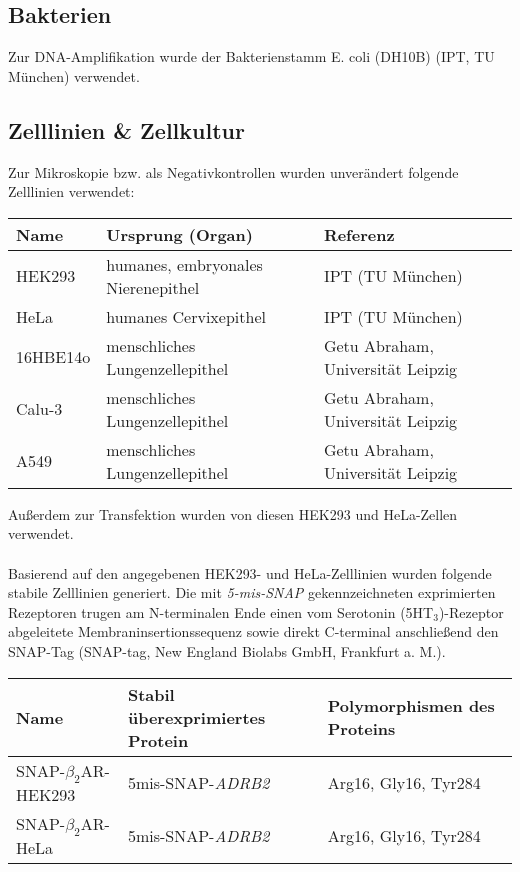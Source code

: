 \subsection{Bakterien}
Zur DNA-Amplifikation wurde der Bakterienstamm E. coli (DH10B) (IPT, TU München) verwendet.

\subsection{Zelllinien \& Zellkultur}
Zur Mikroskopie bzw. als Negativkontrollen wurden unverändert folgende Zelllinien verwendet:

\begin{table}[htsp]
	\begin{tabularx}{\textwidth}{lll}
\toprule
Name		&	Ursprung (Organ)				&	Referenz\\
\midrule
HEK293		&	humanes, embryonales Nierenepithel		&	IPT (TU München)\\
HeLa		&	humanes Cervixepithel					&	IPT (TU München)\\
\midrule
16HBE14o		&	menschliches Lungenzellepithel			&	Getu Abraham, Universität Leipzig\\
Calu-3			&	menschliches Lungenzellepithel			&	Getu Abraham, Universität Leipzig\\
A549			&	menschliches Lungenzellepithel			&	Getu Abraham, Universität Leipzig\\
\bottomrule
\end{tabularx}
\end{table}

Außerdem zur Transfektion wurden von diesen HEK293 und HeLa-Zellen verwendet.
\\ \\
Basierend auf den angegebenen HEK293- und HeLa-Zelllinien wurden folgende stabile Zelllinien generiert. Die mit \textit{5-mis-SNAP} gekennzeichneten exprimierten Rezeptoren trugen am N-terminalen Ende einen vom Serotonin (5HT$_3$)-Rezeptor abgeleitete Membraninsertionssequenz sowie direkt C-terminal anschließend den SNAP-Tag (SNAP-tag, New England Biolabs GmbH, Frankfurt a. M.). 

\begin{table}[htsb]
\begin{tabularx}{\textwidth}{lll}
\toprule
Name		&	Stabil überexprimiertes Protein	&	Polymorphismen des Proteins\\
\midrule
SNAP-$\beta_2$AR-HEK293		&	5mis-SNAP-\textit{ADRB2}		&	Arg16, Gly16, Tyr284\\
SNAP-$\beta_2$AR-HeLa		&	5mis-SNAP-\textit{ADRB2}		&	Arg16, Gly16, Tyr284\\
\bottomrule
\end{tabularx}
\end{table}

